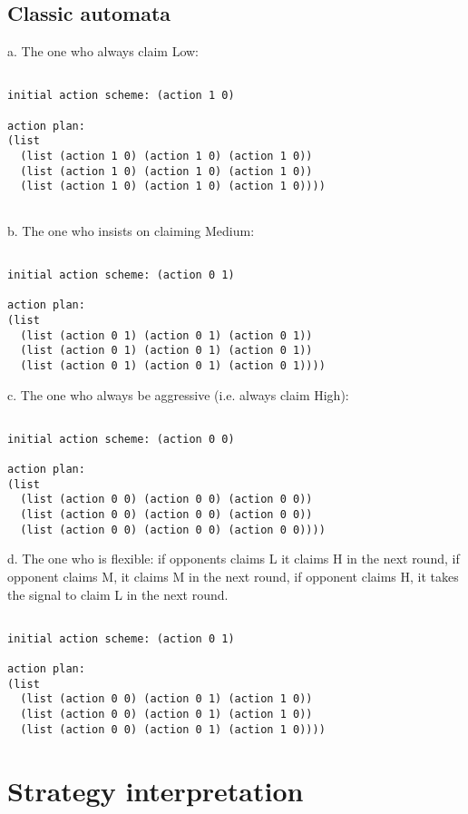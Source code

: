 \documentclass[12.5pt]{report}
\begin{document}
\subsection{Classic automata}

a. The one who always claim Low:

\begin{verbatim}

initial action scheme: (action 1 0)

action plan:
(list
  (list (action 1 0) (action 1 0) (action 1 0))
  (list (action 1 0) (action 1 0) (action 1 0))
  (list (action 1 0) (action 1 0) (action 1 0))))


\end{verbatim}

b. The one who insists on claiming Medium:
\begin{verbatim}

initial action scheme: (action 0 1)

action plan:
(list
  (list (action 0 1) (action 0 1) (action 0 1))
  (list (action 0 1) (action 0 1) (action 0 1))
  (list (action 0 1) (action 0 1) (action 0 1))))

\end{verbatim}

c. The one who always be aggressive (i.e. always claim High):

\begin{verbatim}

initial action scheme: (action 0 0)

action plan:
(list
  (list (action 0 0) (action 0 0) (action 0 0))
  (list (action 0 0) (action 0 0) (action 0 0))
  (list (action 0 0) (action 0 0) (action 0 0))))
\end{verbatim}

d. The one who is flexible: if opponents claims L it claims H in the next round, if opponent claims M, it claims M in the next round, if opponent claims H, it takes the signal to claim L in the next round.

\begin{verbatim}

initial action scheme: (action 0 1)

action plan:
(list
  (list (action 0 0) (action 0 1) (action 1 0))
  (list (action 0 0) (action 0 1) (action 1 0))
  (list (action 0 0) (action 0 1) (action 1 0))))

\end{verbatim}

\section{Strategy interpretation}
\end{document}
